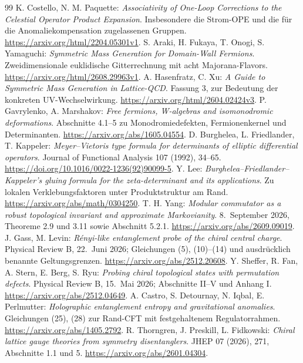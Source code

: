 \begin{thebibliography}{99}
 K. Costello, N. M. Paquette: \emph{Associativity of One-Loop Corrections to the Celestial Operator Product Expansion}. Insbesondere die Strom-OPE und die für die Anomaliekompensation zugelassenen Gruppen. \url{https://arxiv.org/html/2204.05301v1}.
 S. Araki, H. Fukaya, T. Onogi, S. Yamaguchi: \emph{Symmetric Mass Generation for Domain-Wall Fermions}. Zweidimensionale euklidische Gitterrechnung mit acht Majorana-Flavors. \url{https://arxiv.org/html/2608.29963v1}.
 A. Hasenfratz, C. Xu: \emph{A Guide to Symmetric Mass Generation in Lattice-QCD}. Fassung 3, zur Bedeutung der konkreten UV-Wechselwirkung. \url{https://arxiv.org/html/2604.02424v3}.
 P. Gavrylenko, A. Marshakov: \emph{Free fermions, W-algebras and isomonodromic deformations}. Abschnitte 4.1--5 zu Monodromiedefekten, Fermionenkernel und Determinanten. \url{https://arxiv.org/abs/1605.04554}.
 D. Burghelea, L. Friedlander, T. Kappeler: \emph{Meyer--Vietoris type formula for determinants of elliptic differential operators}. Journal of Functional Analysis 107 (1992), 34--65. \url{https://doi.org/10.1016/0022-1236(92)90099-5}.
 Y. Lee: \emph{Burghelea--Friedlander--Kappeler's gluing formula for the zeta-determinant and its applications}. Zu lokalen Verklebungsfaktoren unter Produktstruktur am Rand. \url{https://arxiv.org/abs/math/0304250}.
 T. H. Yang: \emph{Modular commutator as a robust topological invariant and approximate Markovianity}. 8.~September 2026, Theoreme 2.9 und 3.11 sowie Abschnitt 5.2.1. \url{https://arxiv.org/abs/2609.09019}.
 J. Gass, M. Levin: \emph{R\'enyi-like entanglement probe of the chiral central charge}. Physical Review B, 22.~Juni 2026; Gleichungen (5), (10)--(14) und ausdrücklich benannte Geltungsgrenzen. \url{https://arxiv.org/abs/2512.20608}.
 Y. Sheffer, R. Fan, A. Stern, E. Berg, S. Ryu: \emph{Probing chiral topological states with permutation defects}. Physical Review B, 15.~Mai 2026; Abschnitte II--V und Anhang I. \url{https://arxiv.org/abs/2512.04649}.
 A. Castro, S. Detournay, N. Iqbal, E. Perlmutter: \emph{Holographic entanglement entropy and gravitational anomalies}. Gleichungen (25), (28) zur Rand-CFT mit festgehaltenem Regulatorrahmen. \url{https://arxiv.org/abs/1405.2792}.
 R. Thorngren, J. Preskill, L. Fidkowski: \emph{Chiral lattice gauge theories from symmetry disentanglers}. JHEP 07 (2026), 271, Abschnitte 1.1 und 5. \url{https://arxiv.org/abs/2601.04304}.

\end{thebibliography}

